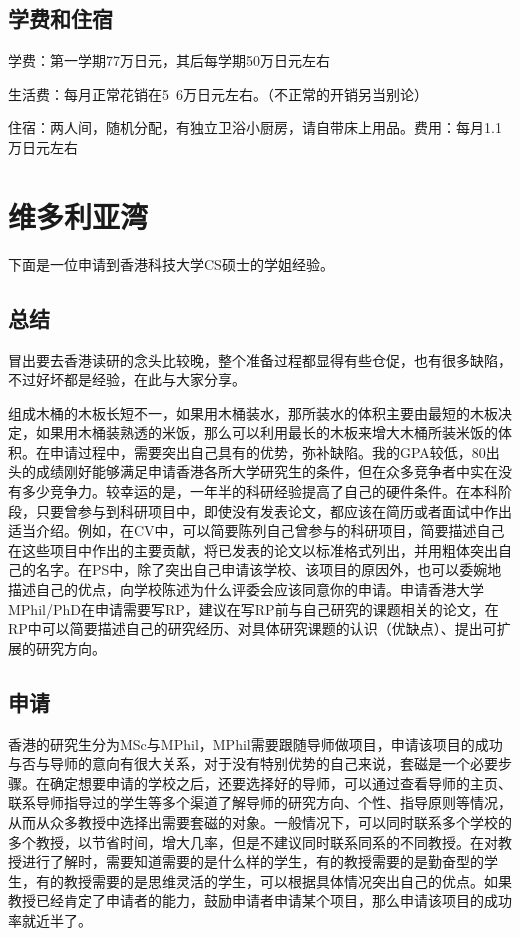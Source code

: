 \subsection{学费和住宿}
学费：第一学期77万日元，其后每学期50万日元左右\par
生活费：每月正常花销在5~6万日元左右。（不正常的开销另当别论）\par
住宿：两人间，随机分配，有独立卫浴小厨房，请自带床上用品。费用：每月1.1万日元左右


\section{维多利亚湾}
下面是一位申请到香港科技大学CS硕士的学姐经验。

\subsection{总结}
冒出要去香港读研的念头比较晚，整个准备过程都显得有些仓促，也有很多缺陷，不过好坏都是经验，在此与大家分享。\par

组成木桶的木板长短不一，如果用木桶装水，那所装水的体积主要由最短的木板决定，如果用木桶装熟透的米饭，那么可以利用最长的木板来增大木桶所装米饭的体积。在申请过程中，需要突出自己具有的优势，弥补缺陷。我的GPA较低，80出头的成绩刚好能够满足申请香港各所大学研究生的条件，但在众多竞争者中实在没有多少竞争力。较幸运的是，一年半的科研经验提高了自己的硬件条件。在本科阶段，只要曾参与到科研项目中，即使没有发表论文，都应该在简历或者面试中作出适当介绍。例如，在CV中，可以简要陈列自己曾参与的科研项目，简要描述自己在这些项目中作出的主要贡献，将已发表的论文以标准格式列出，并用粗体突出自己的名字。在PS中，除了突出自己申请该学校、该项目的原因外，也可以委婉地描述自己的优点，向学校陈述为什么评委会应该同意你的申请。申请香港大学MPhil/PhD在申请需要写RP，建议在写RP前与自己研究的课题相关的论文，在RP中可以简要描述自己的研究经历、对具体研究课题的认识（优缺点）、提出可扩展的研究方向。\par

\subsection{申请}
香港的研究生分为MSc与MPhil，MPhil需要跟随导师做项目，申请该项目的成功与否与导师的意向有很大关系，对于没有特别优势的自己来说，套磁是一个必要步骤。在确定想要申请的学校之后，还要选择好的导师，可以通过查看导师的主页、联系导师指导过的学生等多个渠道了解导师的研究方向、个性、指导原则等情况，从而从众多教授中选择出需要套磁的对象。一般情况下，可以同时联系多个学校的多个教授，以节省时间，增大几率，但是不建议同时联系同系的不同教授。在对教授进行了解时，需要知道需要的是什么样的学生，有的教授需要的是勤奋型的学生，有的教授需要的是思维灵活的学生，可以根据具体情况突出自己的优点。如果教授已经肯定了申请者的能力，鼓励申请者申请某个项目，那么申请该项目的成功率就近半了。\par


